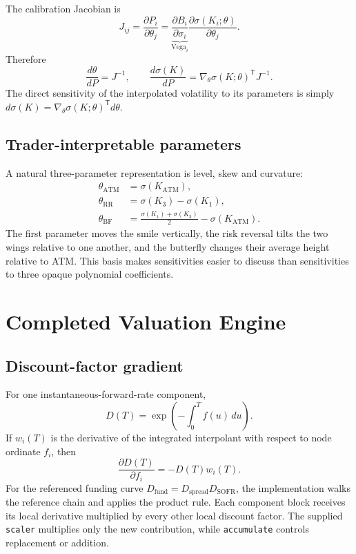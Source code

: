 \documentclass[11pt]{article}
\numberwithin{equation}{section}
\begin{document}
The calibration Jacobian is
\begin{equation}
J_{ij}=\frac{\partial P_i}{\partial\theta_j}
=\underbrace{\frac{\partial B_i}{\partial\sigma_i}}_{\mathrm{Vega}_i}
\frac{\partial\sigma(K_i;\theta)}{\partial\theta_j}.
\end{equation}
Therefore
\begin{equation}
\frac{d\theta}{dP}=J^{-1},
\qquad
\boxed{\frac{d\sigma(K)}{dP}
=\nabla_\theta\sigma(K;\theta)^\mathsf{T}J^{-1}.}
\end{equation}
The direct sensitivity of the interpolated volatility to its parameters is
simply $d\sigma(K)=\nabla_\theta\sigma(K;\theta)^\mathsf{T}d\theta$.

\subsection{Trader-interpretable parameters}
A natural three-parameter representation is level, skew and curvature:
\begin{align}
\theta_{\mathrm{ATM}}&=\sigma(K_{\mathrm{ATM}}),\\
\theta_{\mathrm{RR}}&=\sigma(K_3)-\sigma(K_1),\\
\theta_{\mathrm{BF}}&=\frac{\sigma(K_1)+\sigma(K_3)}{2}-\sigma(K_{\mathrm{ATM}}).
\end{align}
The first parameter moves the smile vertically, the risk reversal tilts the
two wings relative to one another, and the butterfly changes their average
height relative to ATM. This basis makes sensitivities easier to discuss than
sensitivities to three opaque polynomial coefficients.

\section{Completed Valuation Engine}
\subsection{Discount-factor gradient}
For one instantaneous-forward-rate component,
\begin{equation}
D(T)=\exp\left(-\int_0^T f(u)\,du\right).
\end{equation}
If $w_i(T)$ is the derivative of the integrated interpolant with respect to
node ordinate $f_i$, then
\begin{equation}
\boxed{\frac{\partial D(T)}{\partial f_i}=-D(T)w_i(T).}
\end{equation}
For the referenced funding curve
$D_{\mathrm{fund}}=D_{\mathrm{spread}}D_{\mathrm{SOFR}}$, the implementation
walks the reference chain and applies the product rule. Each component block
receives its local derivative multiplied by every other local discount factor.
The supplied \texttt{scaler} multiplies only the new contribution, while
\texttt{accumulate} controls replacement or addition.
\end{document}
